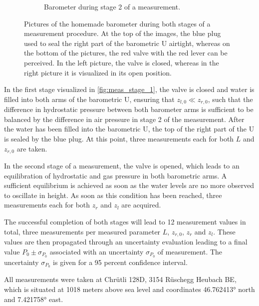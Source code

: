 \documentclass[a4paper,10pt, twocolumn]{article}
\begin{document}
\begin{figure}[h!]
\begin{subfigure}{0.22\textwidth}
		\caption{Barometer during stage 2 of a measurement.}
		\label{fig:meas_stage_2}
	\end{subfigure}
	\caption{Pictures of the homemade barometer during both stages of a measurement procedure. At the top of the images, the blue plug used to seal the right part of the barometric U airtight, whereas on the bottom of the pictures, the red valve with the red lever can be perceived. In the left picture, the valve is closed, whereas in the right picture it is visualized in its open position.}
	\label{fig:measurement_procedure}
\end{figure}

In the first stage visualized in \cref{fig:meas_stage_1}, the valve is closed and water is filled into both arms of the barometric U, ensuring that $z_{l,0} \ll z_{r,0}$, such that the difference in hydrostatic pressure between both barometer arms is sufficient to be balanced by the difference in air pressure in stage 2 of the measurement. After the water has been filled into the barometric U, the top of the right part of the U is sealed by the blue plug. At this point, three measurements each for both $L$ and $z_{r,0}$ are taken.

In the second stage of a measurement, the valve is opened, which leads to an equilibration of hydrostatic and gas pressure in both barometric arms. A sufficient equilibrium is achieved as soon as the water levels are no more observed to oscillate in height. As soon as this condition has been reached, three measurements each for both $z_r$ and $z_l$ are acquired.

The successful completion of both stages will lead to 12 measurement values in total, three measurements per measured parameter $L$, $z_{r,0}$, $z_r$ and $z_l$. These values are then propagated through an uncertainty evaluation leading to a final value $P_0 \pm \sigma_{P_0}$ associated with an uncertainty $\sigma_{P_0}$ of measurement. The uncertainty $\sigma_{P_0}$ is given for a 95 percent confidence interval. 

All measurements were taken at Chrütli 128D, 3154 Rüschegg Heubach BE, which is situated at 1018 meters above sea level and coordinates \ang{46.762413} north and \ang{7.421758} east.
\end{document}
